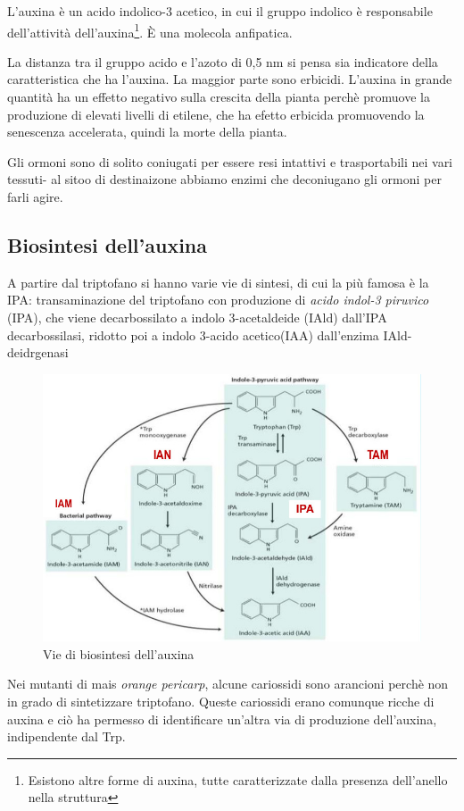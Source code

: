 \documentclass[a4paper,12pt]{book}
\begin{document}
L'auxina è un acido indolico-3 acetico, in cui il gruppo indolico è responsabile dell'attività dell'auxina\footnote{Esistono altre forme di auxina, tutte caratterizzate dalla presenza dell'anello nella struttura}. È una molecola anfipatica.

La distanza tra il gruppo acido e l'azoto di 0,5 nm si pensa sia indicatore della caratteristica che ha l'auxina. La maggior parte sono erbicidi. L'auxina in grande quantità ha un effetto negativo sulla crescita della pianta perchè promuove la produzione di elevati livelli di etilene, che ha efetto erbicida promuovendo la senescenza accelerata, quindi la morte della pianta.

Gli ormoni sono di solito coniugati per essere resi intattivi e trasportabili nei vari tessuti- al sitoo di destinaizone abbiamo enzimi che deconiugano gli ormoni per farli agire. 
\subsection{Biosintesi dell'auxina}
A partire dal triptofano si hanno varie vie di sintesi, di cui la più famosa è la IPA: transaminazione del triptofano con produzione di \emph{acido indol-3 piruvico} (IPA), che viene decarbossilato a indolo 3-acetaldeide (IAld) dall'IPA decarbossilasi, ridotto poi a indolo 3-acido acetico(IAA) dall'enzima IAld-deidrgenasi
\begin{figure}[H]
\centering
\includegraphics[scale=0.4]{immagini/biosintesi.jpg}
\caption{Vie di biosintesi dell'auxina}
\end{figure}

Nei mutanti di mais \emph{orange pericarp}, alcune cariossidi sono arancioni perchè non in grado di sintetizzare triptofano. Queste cariossidi erano comunque ricche di auxina e ciò ha permesso di identificare un'altra via di produzione dell'auxina, indipendente dal Trp.
\end{document}

